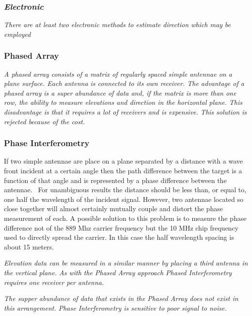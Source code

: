 \documentclass[a4paper]{report}
\newcommand\textstyleEmphasis[1]{\textit{#1}}
\numberwithin{equation}{chapter}
\begin{document}
\subsubsection[Electronic]{\textstyleEmphasis{\textup{Electronic}}}
\textstyleEmphasis{\textup{There are at least two electronic methods to
estimate direction which may be employed}}

\subsubsection[Phased Array]{Phased Array}
\textstyleEmphasis{\textup{A phased array consists of a matrix of
regularly spaced simple antennae on a plane surface. Each antenna is
connected to its own receiver. The advantage of a phased array is a
super abundance of data and, if the matrix is more than one row, the
ability to measure elevations and direction in the horizontal plane.
This disadvantage is that it requires a lot of receivers and is
expensive. This solution is rejected because of the cost.}}

\subsubsection[Phase Interferometry]{Phase Interferometry}
If two simple antennae are place on a plane
separated by a distance with a wave front incident at a certain angle
then the path difference between the target is a function of that angle
and is represented by a phase difference between the antennae. \ For
unambiguous results the distance should be less than, or equal to, one
half the wavelength of the incident signal. However, two antennae
located so close together will almost certainly mutually couple and
distort the phase measurement of each. A possible solution to this problem is to measure the phase difference not of the 889 Mhz carrier frequency but the 10 MHz chip frequency used to directly spread the carrier. In this case the half wavelength spacing is about 15 meters.

\bigskip

\textstyleEmphasis{\textup{Elevation data can be measured in a similar
manner by placing a third antenna in the vertical plane. As with the
Phased Array approach Phased Interferometry requires one receiver per
antenna.}}

\bigskip

\textstyleEmphasis{\textup{The supper abundance of data that exists in
the Phased Array does not exist in this arrangement. Phase
Interferometry is sensitive to poor signal to noise.}}
\end{document}
